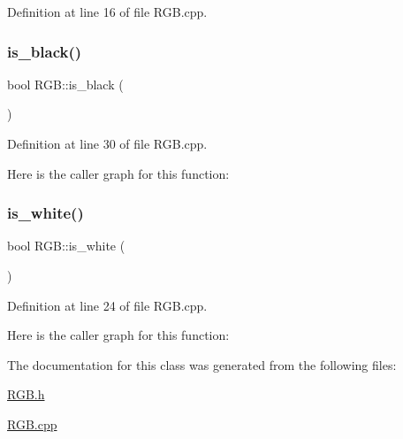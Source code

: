 Definition at line 16 of file R\+G\+B.\+cpp.

\mbox{\label{class_r_g_b_a6d5013f3b077886a1a92fa2b16628d22}} 
\subsubsection{\texorpdfstring{is\+\_\+black()}{is\_black()}}
{\footnotesize\ttfamily bool R\+G\+B\+::is\+\_\+black (\begin{DoxyParamCaption}{ }\end{DoxyParamCaption})}



Definition at line 30 of file R\+G\+B.\+cpp.

Here is the caller graph for this function\+:
\mbox{\label{class_r_g_b_aa8289d37cc58a81e02b857fb91bfca5c}} 
\subsubsection{\texorpdfstring{is\+\_\+white()}{is\_white()}}
{\footnotesize\ttfamily bool R\+G\+B\+::is\+\_\+white (\begin{DoxyParamCaption}{ }\end{DoxyParamCaption})}



Definition at line 24 of file R\+G\+B.\+cpp.

Here is the caller graph for this function\+:


The documentation for this class was generated from the following files\+:\begin{DoxyCompactItemize}
\item 
\mbox{\hyperlink{_r_g_b_8h}{R\+G\+B.\+h}}\item 
\mbox{\hyperlink{_r_g_b_8cpp}{R\+G\+B.\+cpp}}\end{DoxyCompactItemize}
